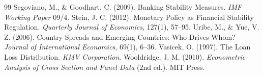 \begin{thebibliography}{99}
 Segoviano, M., \& Goodhart, C. (2009). Banking Stability Measures. \textit{IMF Working Paper} 09/4.
 Stein, J. C. (2012). Monetary Policy as Financial Stability Regulation. \textit{Quarterly Journal of Economics}, 127(1), 57--95.
 Uribe, M., \& Yue, V. Z. (2006). Country Spreads and Emerging Countries: Who Drives Whom? \textit{Journal of International Economics}, 69(1), 6--36.
 Vasicek, O. (1997). The Loan Loss Distribution. \textit{KMV Corporation}.
 Wooldridge, J. M. (2010). \textit{Econometric Analysis of Cross Section and Panel Data} (2nd ed.). MIT Press.
\end{thebibliography}
